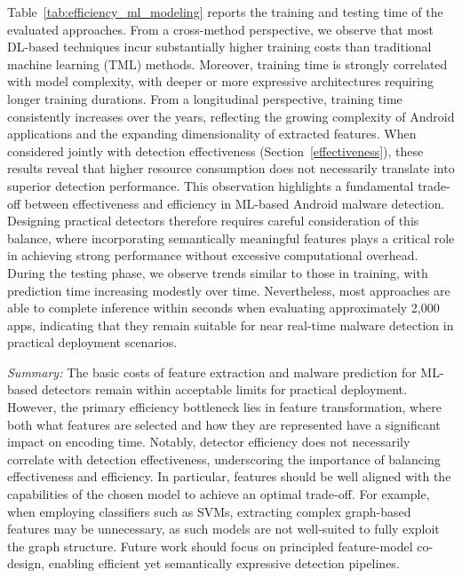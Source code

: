 Table~\ref{tab:efficiency_ml_modeling} reports the training and testing time of the evaluated approaches.
From a cross-method perspective, we observe that most DL-based techniques incur substantially higher training costs than traditional machine learning (TML) methods.
Moreover, training time is strongly correlated with model complexity, with deeper or more expressive architectures requiring longer training durations.
From a longitudinal perspective, training time consistently increases over the years, reflecting the growing complexity of Android applications and the expanding dimensionality of extracted features.
When considered jointly with detection effectiveness (Section~\ref{effectiveness}), these results reveal that higher resource consumption does not necessarily translate into superior detection performance.
This observation highlights a fundamental trade-off between effectiveness and efficiency in ML-based Android malware detection.
Designing practical detectors therefore requires careful consideration of this balance, where incorporating semantically meaningful features plays a critical role in achieving strong performance without excessive computational overhead.
During the testing phase, we observe trends similar to those in training, with prediction time increasing modestly over time.
Nevertheless, most approaches are able to complete inference within seconds when evaluating approximately 2,000 apps, indicating that they remain suitable for near real-time malware detection in practical deployment scenarios.









\begin{conclusionbox}
    \textit{Summary:}
    The basic costs of feature extraction and malware prediction for ML-based detectors remain within acceptable limits for practical deployment. However, the primary efficiency bottleneck lies in feature transformation, where both what features are selected and how they are represented have a significant impact on encoding time. Notably, detector efficiency does not necessarily correlate with detection effectiveness, underscoring the importance of balancing effectiveness and efficiency.
    In particular, features should be well aligned with the capabilities of the chosen model to achieve an optimal trade-off. For example, when employing classifiers such as SVMs, extracting complex graph-based features may be unnecessary, as such models are not well-suited to fully exploit the graph structure. Future work should focus on principled feature-model co-design, enabling efficient yet semantically expressive detection pipelines.
\end{conclusionbox}

